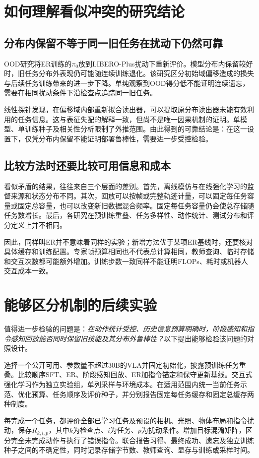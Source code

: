 \documentclass[UTF8,11pt,a4paper,fontset=fandol]{ctexart}
\begin{document}
\section{如何理解看似冲突的研究结论}
\subsection{分布内保留不等于同一旧任务在扰动下仍然可靠}
OOD研究将ER训练的$\pi_0$放到LIBERO-Plus扰动下重新评价\cite{ood}。模型分布内保留较好时，旧任务分布外表现仍可能随连续训练退化。该研究区分初始域偏移造成的损失与后续任务训练带来的进一步下降。单纯观察到OOD得分低不能证明连续遗忘，需要在相同扰动条件下沿检查点追踪同一旧任务。

线性探针发现，在偏移域内部重新拟合读出器，可以提取原分布读出器未能有效利用的任务信息。这与表征失配的解释一致，但尚不是唯一因果机制的证明。单模型、单训练种子及相关性分析限制了外推范围。由此得到的可靠结论是：在这一设置下，仅凭分布内保留不能证明部署鲁棒性，需要进一步受控检验。

\subsection{比较方法时还要比较可用信息和成本}
看似矛盾的结果，往往来自三个层面的差别。首先，离线模仿与在线强化学习的监督来源和状态分布不同。其次，回放可以按帧或完整轨迹计量，可以固定每任务容量或固定总容量，也可以改变新旧数据混合频率。固定每任务容量仍会使总存储随任务数增长。最后，各研究在预训练重叠、任务多样性、动作统计、测试分布和评分定义上并不相同。

因此，同样叫ER并不意味着同样的实验；新增方法优于某项ER基线时，还要核对具体缓存和训练配置。专家帧预算相同也不代表总计算相同，教师查询、临时存储和交互次数都可能额外增加。训练步数一致同样不能证明FLOPs、耗时或机器人交互成本一致。

\section{能够区分机制的后续实验}
值得进一步检验的问题是：\emph{在动作统计受控、历史信息预算明确时，阶段感知和指令感知回放能否同时保留旧技能及其分布外鲁棒性？}以下提出能够检验该问题的对照设计。

选择一个公开可用、参数量不超过30B的VLA并固定初始化，披露预训练任务重叠。比较顺序SFT、ER、阶段感知回放、ER加指令锚定和保守更新基线。交互式强化学习作为独立实验组，单列采样与环境成本。在适用范围内统一当前任务示范、优化预算、任务顺序及评价种子，并分别报告固定每任务缓存和固定总缓存两种制度。

每完成一个任务，都评价全部已学习任务及预设的相机、光照、物体布局和指令扰动，保存$R_{k,i,p}$，其中$k$为检查点、$i$为任务、$p$为扰动条件。增加目标混淆矩阵，区分完全未完成动作与执行了错误指令。联合报告习得、最终成功、遗忘及独立训练种子之间的不确定性，同时记录存储字节数、教师查询、显存与训练或采样时间。
\end{document}
